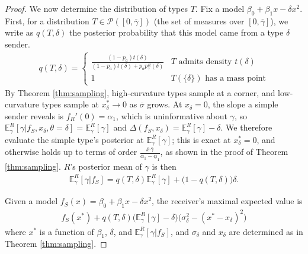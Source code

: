 \documentclass[11pt,dvipsnames]{article}
\begin{document}
\begin{appendix}
\begin{proof}
We now determine the distribution of types $T$. 
Fix a model $\beta_0+\beta_1x - \delta x^2$.
First, for a distribution $T \in \mathcal{P}([0,\overline{\gamma}])$ (the set of measures over $[0,\overline{\gamma}]$), we write as $q(T,\delta)$ the posterior probability that this model came from a type $\delta$ sender. 
\begin{align*}
q(T,\delta) = 
\begin{cases}
\frac{(1-p_a)t(\delta)}{(1-p_a)t(\delta)+p_ap_\gamma^R(\delta)} & T \text{ admits density } t(\delta) \\
1 & T(\{\delta\}) \text{ has a mass point}	
\end{cases}
\end{align*}
By Theorem \ref{thm:sampling}, high-curvature types sample at a corner, and low-curvature types sample at $x_\delta^*\to0$ as $\overline{\sigma}$ grows. At $x_\delta=0$, the slope a simple sender reveals is $f_R'(0)=\alpha_1$, which is uninformative about $\gamma$, so $\mathbb{E}_\gamma^R[\gamma|f_S,x_\delta,\theta=\delta]=\mathbb{E}_\gamma^R[\gamma]$ and $\Delta(f_S,x_\delta) = \mathbb{E}_\gamma^R[\gamma]-\delta$. We therefore evaluate the simple type's posterior at $\mathbb{E}_\gamma^R[\gamma]$; this is exact at $x_\delta^*=0$, and otherwise holds up to terms of order $\frac{\overline{x}\,\overline{\gamma}}{\overline{\alpha}_1-\underline{\alpha}_1}$, as shown in the proof of Theorem \ref{thm:sampling}. $R$'s posterior mean of $\gamma$ is then
\begin{align*}
\mathbb{E}_\gamma^R[\gamma|f_S]
= q(T,\delta)\mathbb{E}_\gamma^R[\gamma]+\big(1-q(T,\delta)\big)\delta.
\end{align*}


Given a model $f_S(x)=\beta_0+\beta_1x - \delta x^2$, the receiver's maximal expected value is
\begin{align*}
f_S(x^*) + 	q(T,\delta)\big(\mathbb{E}_\gamma^R[\gamma]-\delta\big)\big(\sigma_\delta^2-(x^*-x_\delta)^2\big)
\end{align*}
where $x^*$ is a function of $\beta_1$, $\delta$, and $\mathbb{E}_\gamma^R[\gamma|f_S]$, and $\sigma_\delta$ and $x_\delta$ are determined as in Theorem \ref{thm:sampling}. 
%


\end{proof}
\end{appendix}
\end{document}
